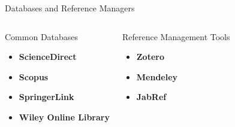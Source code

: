\begin{frame}{Databases and Reference Managers}
  \begin{columns}[T]
    \begin{block}{Common Databases}
      \begin{itemize}
        \item \textbf{ScienceDirect}
        \item \textbf{Scopus}
        \item \textbf{SpringerLink}
        \item \textbf{Wiley Online Library}
      \end{itemize}
    \end{block}

    \hspace{0.5cm}
    \pause

    \begin{block}{Reference Management Tools}
      \begin{itemize}
        \item \textbf{Zotero}
        \item \textbf{Mendeley}
        \item \textbf{JabRef}
      \end{itemize}
    \end{block}
  \end{columns}
\end{frame}

